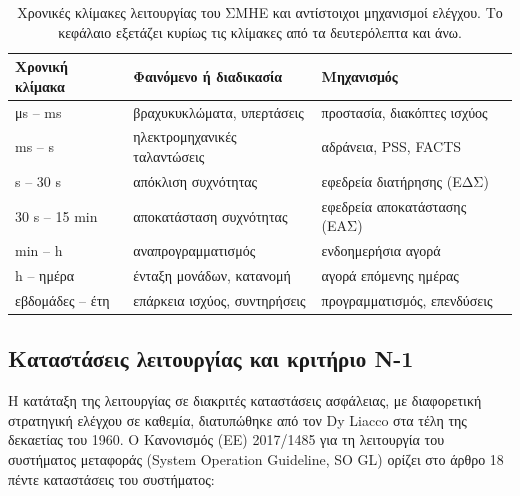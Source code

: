 \begin{table}[!htbp]
\centering
\begin{tabular}{lll}
\hline
Χρονική κλίμακα & Φαινόμενο ή διαδικασία & Μηχανισμός \\
\hline
μs -- ms   & βραχυκυκλώματα, υπερτάσεις   & προστασία, διακόπτες ισχύος \\
ms -- s    & ηλεκτρομηχανικές ταλαντώσεις & αδράνεια, PSS, FACTS \\
s -- 30 s  & απόκλιση συχνότητας          & εφεδρεία διατήρησης (ΕΔΣ) \\
30 s -- 15 min & αποκατάσταση συχνότητας  & εφεδρεία αποκατάστασης (ΕΑΣ) \\
min -- h   & αναπρογραμματισμός           & ενδοημερήσια αγορά \\
h -- ημέρα & ένταξη μονάδων, κατανομή     & αγορά επόμενης ημέρας \\
εβδομάδες -- έτη & επάρκεια ισχύος, συντηρήσεις & προγραμματισμός, επενδύσεις \\
\hline
\end{tabular}
\caption{Χρονικές κλίμακες λειτουργίας του ΣΜΗΕ και αντίστοιχοι μηχανισμοί ελέγχου. Το
κεφάλαιο εξετάζει κυρίως τις κλίμακες από τα δευτερόλεπτα και άνω.}
\label{tab:chronikes-klimakes}
\end{table}

\subsection{Καταστάσεις λειτουργίας και κριτήριο N-1}

Η κατάταξη της λειτουργίας σε διακριτές καταστάσεις ασφάλειας, με διαφορετική στρατηγική
ελέγχου σε καθεμία, διατυπώθηκε από τον Dy Liacco στα τέλη της δεκαετίας του 1960. Ο
Κανονισμός (ΕΕ) 2017/1485 για τη λειτουργία του συστήματος μεταφοράς (System Operation
Guideline, SO GL) ορίζει στο άρθρο 18 πέντε καταστάσεις του συστήματος:

